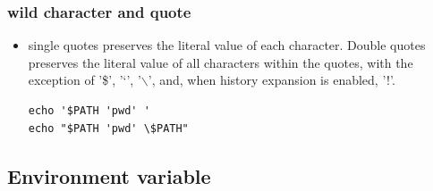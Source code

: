 \documentclass[a4paper,12pt,twoside]{book}
\begin{document}
\subsubsection{wild character and quote}
\begin{itemize}
\item single quotes preserves the literal value of each character.  Double quotes preserves the literal value of all characters within the quotes, with the exception of '\$', '`', '$\backslash$', and, when history expansion is enabled, '!'. 
\begin{verbatim}
echo '$PATH 'pwd' '
echo "$PATH 'pwd' \$PATH"
\end{verbatim}
\end{itemize}

\subsection{Environment variable}
\end{document}
